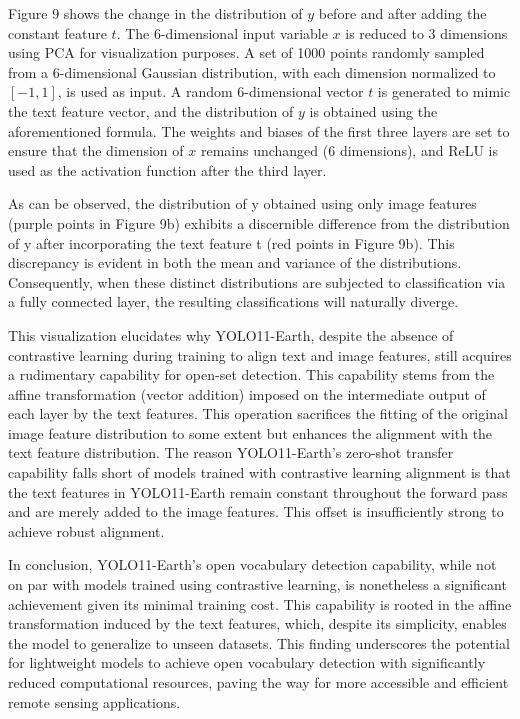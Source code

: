 \documentclass{article}
\begin{document}
Figure 9 shows the change in the distribution of $y$ before and after adding the constant feature $t$. 
The 6-dimensional input variable $x$ is reduced to 3 dimensions using PCA for visualization purposes. 
A set of 1000 points randomly sampled from a 6-dimensional Gaussian distribution, with each dimension 
normalized to $[-1,1]$, is used as input. A random 6-dimensional vector $t$ is generated to mimic the text 
feature vector, and the distribution of $y$ is obtained using the aforementioned formula. The weights and 
biases of the first three layers are set to ensure that the dimension of $x$ remains unchanged (6 dimensions), 
and ReLU is used as the activation function after the third layer.

As can be observed, the distribution of y obtained using only image features (purple points in Figure 9b) 
exhibits a discernible difference from the distribution of y after incorporating the text feature t (red points 
in Figure 9b). This discrepancy is evident in both the mean and variance of the distributions. Consequently, 
when these distinct distributions are subjected to classification via a fully connected layer, the resulting 
classifications will naturally diverge.

This visualization elucidates why YOLO11-Earth, despite the absence of contrastive learning during training 
to align text and image features, still acquires a rudimentary capability for open-set detection. This capability 
stems from the affine transformation (vector addition) imposed on the intermediate output of each layer by the 
text features. This operation sacrifices the fitting of the original image feature distribution to some extent 
but enhances the alignment with the text feature distribution. The reason YOLO11-Earth's zero-shot transfer 
capability falls short of models trained with contrastive learning alignment is that the text features in 
YOLO11-Earth remain constant throughout the forward pass and are merely added to the image features. This offset 
is insufficiently strong to achieve robust alignment.

In conclusion, YOLO11-Earth's open vocabulary detection capability, while not on par with models trained 
using contrastive learning, is nonetheless a significant achievement given its minimal training cost. This 
capability is rooted in the affine transformation induced by the text features, which, despite its simplicity, 
enables the model to generalize to unseen datasets. This finding underscores the potential for lightweight models 
to achieve open vocabulary detection with significantly reduced computational resources, paving the way for 
more accessible and efficient remote sensing applications.
\end{document}
